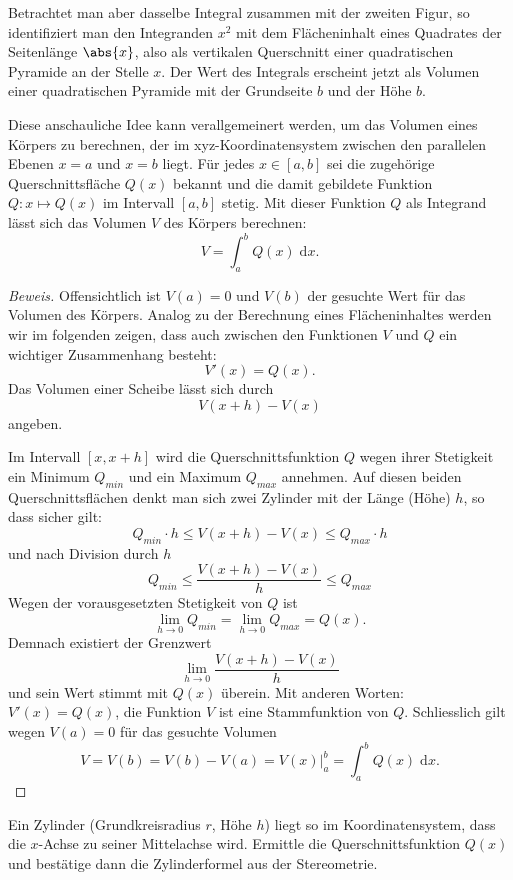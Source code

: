 \documentclass[%
11pt,%
twoside,%
titlepage,%
german,%
headsepline%
]{scrartcl}
\begin{document}
Betrachtet man aber dasselbe Integral zusammen mit der zweiten Figur, so identifiziert man den Integranden $x^2$ mit dem Flächeninhalt eines Quadrates der Seitenlänge $\abs{x}$, also als vertikalen Querschnitt einer quadratischen Pyramide an der Stelle $x$. Der Wert des Integrals erscheint jetzt als Volumen einer quadratischen Pyramide mit der Grundseite $b$ und der Höhe $b$.

Diese anschauliche Idee kann verallgemeinert werden, um das Volumen eines Körpers zu berechnen, der im xyz-Koordinatensystem zwischen den parallelen Ebenen $x = a$ und $x = b$ liegt.
Für jedes $x\in [a,b]$ sei die zugehörige Querschnittsfläche $Q(x)$ bekannt und die damit gebildete Funktion
$Q:x\mapsto Q(x)$ im Intervall $[a,b]$ stetig. Mit dieser Funktion $Q$ als Integrand lässt sich das Volumen $V$ des Körpers berechnen:
$$V=\int_a^bQ(x)\;\mathrm{d}x.$$

\begin{proof}[Beweis]
Offensichtlich ist $V(a) = 0$ und $V(b)$ der gesuchte Wert für das Volumen des Körpers.
Analog zu der Berechnung eines Flächeninhaltes werden wir im folgenden zeigen, dass auch zwischen den Funktionen $V$ und $Q$ ein wichtiger Zusammenhang besteht:
$$V'(x) = Q(x).$$
Das Volumen einer Scheibe lässt sich durch
$$V(x+h) - V(x)$$
angeben.

Im Intervall $[x,x+h]$ wird die Querschnittsfunktion $Q$ wegen ihrer Stetigkeit ein Minimum $Q_{min}$ und ein Maximum $Q_{max}$ annehmen. Auf diesen beiden Querschnittsflächen denkt man sich zwei Zylinder mit der Länge (Höhe) $h$, so dass sicher gilt:
$$Q_{min}\cdot h \leq V(x+h) - V(x) \leq Q_{max}\cdot h$$
und nach Division durch $h$
$$Q_{min} \leq \frac{V(x+h) - V(x)}{h} \leq Q_{max}$$
Wegen der vorausgesetzten Stetigkeit von $Q$ ist
$$\lim_{h\to0} Q_{min} = \lim_{h\to0} Q_{max} = Q(x).$$
Demnach existiert der Grenzwert
$$\lim_{h\to0}\frac{V(x+h) - V(x)}{h}$$
und sein Wert stimmt mit $Q(x)$ überein.
Mit anderen Worten: $V'(x) = Q(x)$, die Funktion $V$ ist eine Stammfunktion von $Q$. Schliesslich gilt wegen $V(a) = 0$ für das gesuchte Volumen
$$V = V(b) = V(b) - V(a) = V(x)|_a^b= \int_a^bQ(x)\;\mathrm{d}x.$$
\end{proof}

\begin{ueb}[Zylinder]
Ein Zylinder (Grundkreisradius $r$, Höhe $h$) liegt so im Koordinatensystem, dass die $x$-Achse zu seiner Mittelachse wird. Ermittle die Querschnittsfunktion $Q(x)$ und bestätige dann die Zylinderformel aus der Stereometrie.
\end{ueb}
\end{document}
